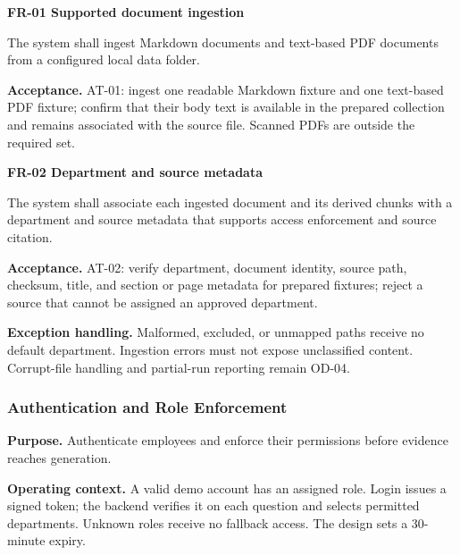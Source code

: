 \documentclass[11pt,letterpaper]{article}
\begin{document}

\textbf{FR-01 Supported document ingestion}\par

The system shall ingest Markdown documents and text-based PDF documents from a configured local data folder.\par

\textbf{Acceptance.} AT-01: ingest one readable Markdown fixture and one text-based PDF fixture; confirm that their body text is available in the prepared collection and remains associated with the source file. Scanned PDFs are outside the required set.\par


\textbf{FR-02 Department and source metadata}\par

The system shall associate each ingested document and its derived chunks with a department and source metadata that supports access enforcement and source citation.\par

\textbf{Acceptance.} AT-02: verify department, document identity, source path, checksum, title, and section or page metadata for prepared fixtures; reject a source that cannot be assigned an approved department.\par

\textbf{Exception handling.} Malformed, excluded, or unmapped paths receive no default department. Ingestion errors must not expose unclassified content. Corrupt-file handling and partial-run reporting remain OD-04.\par

\subsubsection{Authentication and Role Enforcement}

\textbf{Purpose.} Authenticate employees and enforce their permissions before evidence reaches generation.\par

\textbf{Operating context.} A valid demo account has an assigned role. Login issues a signed token; the backend verifies it on each question and selects permitted departments. Unknown roles receive no fallback access. The design sets a 30-minute expiry.\par

\end{document}

